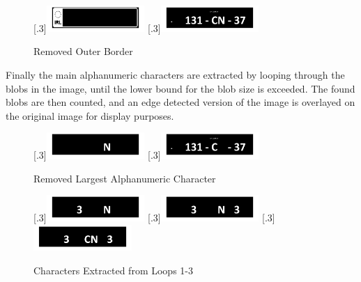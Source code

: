 \documentclass[a4paper]{article}
\begin{document}
	\begin{figure}[H]
		\centering
		[.3\linewidth]{\includegraphics[height=1cm]{Results/Q2/NumPlate1/qanumber_plate_1Border.jpg}}%
		[.3\linewidth]{\includegraphics[height=1cm]{Results/Q2/NumPlate1/qanumber_plate_1NoBorder.jpg}}%
		\caption{Removed Outer Border}
		\label{fig:}
	\end{figure}
	\par Finally the main alphanumeric characters are extracted by looping
	through the blobs in the image, until the lower bound for the blob size
	is exceeded. The found blobs are then counted, and an edge detected
	version of the image is overlayed on the original image for display
	purposes.
	\begin{figure}[H]
		\centering
		[.3\linewidth]{\includegraphics[height=1cm]{Results/Q2/NumPlate1/qanumber_plate_1BigChar.jpg}}%
		[.3\linewidth]{\includegraphics[height=1cm]{Results/Q2/NumPlate1/qanumber_plate_1Remain.jpg}}%
		\caption{Removed Largest Alphanumeric Character}
		\label{fig:}
	\end{figure}
	\begin{figure}[H]
		\centering
		[.3\linewidth]{\includegraphics[height=1cm]{Results/Q2/NumPlate1/qanumber_plate_1Added1.jpg}}%
		[.3\linewidth]{\includegraphics[height=1cm]{Results/Q2/NumPlate1/qanumber_plate_1Added2.jpg}}%
		[.3\linewidth]{\includegraphics[height=1cm]{Results/Q2/NumPlate1/qanumber_plate_1Added3.jpg}}%
		\caption{Characters Extracted from Loops 1-3}
		\label{fig:}
	\end{figure}
\end{document}
